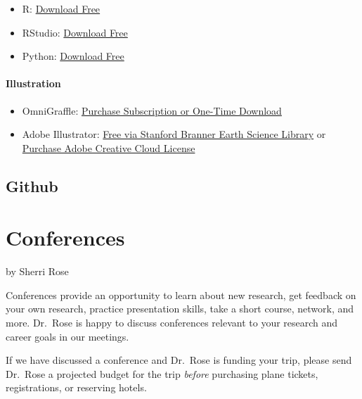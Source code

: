 \documentclass[
]{book}
\providecommand{\tightlist}{%
  \setlength{\itemsep}{0pt}\setlength{\parskip}{0pt}}
\begin{document}
\begin{itemize}
\tightlist
\item
  R: \href{https://cran.r-project.org/}{Download Free}
\item
  RStudio: \href{https://posit.co/products/open-source/rstudio/}{Download Free}
\item
  Python: \href{https://www.python.org/downloads/}{Download Free}
\end{itemize}

\hypertarget{illustration}{%
\subsubsection*{Illustration}\label{illustration}}

\begin{itemize}
\tightlist
\item
  OmniGraffle: \href{https://store.omnigroup.com/omnigraffle}{Purchase Subscription or One-Time Download}
\item
  Adobe Illustrator: \href{https://library.stanford.edu/branner/using-branner-library}{Free via Stanford Branner Earth Science Library} or \href{https://web.stanford.edu/dept/its/cgi-bin/services/software/portal/detail.php?action=view_product\&product_id=1163}{Purchase Adobe Creative Cloud License}
\end{itemize}

\hypertarget{github}{%
\section{Github}\label{github}}

\hypertarget{conferences}{%
\chapter{Conferences}\label{conferences}}

by Sherri Rose

Conferences provide an opportunity to learn about new research, get feedback on your own research, practice presentation skills, take a short course, network, and more. Dr.~Rose is happy to discuss conferences relevant to your research and career goals in our meetings.

If we have discussed a conference and Dr.~Rose is funding your trip, please send Dr.~Rose a projected budget for the trip \emph{before} purchasing plane tickets, registrations, or reserving hotels.
\end{document}
